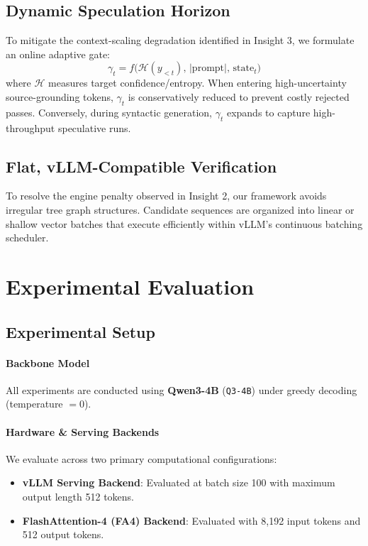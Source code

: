 \documentclass[11pt]{article}
\begin{document}
\subsection{Dynamic Speculation Horizon}
To mitigate the context-scaling degradation identified in Insight 3, we formulate an online adaptive gate:
\begin{equation}
    \gamma_t = f\Big(\mathcal{H}(y_{<t}),\, |\mathrm{prompt}|,\, \mathrm{state}_t\Big)
\end{equation}
where $\mathcal{H}$ measures target confidence/entropy. When entering high-uncertainty source-grounding tokens, $\gamma_t$ is conservatively reduced to prevent costly rejected passes. Conversely, during syntactic generation, $\gamma_t$ expands to capture high-throughput speculative runs.

\subsection{Flat, vLLM-Compatible Verification}
To resolve the engine penalty observed in Insight 2, our framework avoids irregular tree graph structures. Candidate sequences are organized into linear or shallow vector batches that execute efficiently within vLLM's continuous batching scheduler.

\section{Experimental Evaluation}

\subsection{Experimental Setup}
\paragraph{Backbone Model}
All experiments are conducted using \textbf{Qwen3-4B} (\texttt{Q3-4B}) under greedy decoding (temperature $=0$).

\paragraph{Hardware \& Serving Backends}
We evaluate across two primary computational configurations:
\begin{itemize}
    \item \textbf{vLLM Serving Backend}: Evaluated at batch size 100 with maximum output length 512 tokens.
    \item \textbf{FlashAttention-4 (FA4) Backend}: Evaluated with 8,192 input tokens and 512 output tokens.
\end{itemize}
\end{document}
